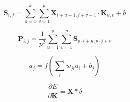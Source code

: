 
\begin{equation}
\mathbf{S}_{i,j} = \sum_{u=1}^{k} \sum_{v=1}^{k} \mathbf{X}_{i+u-1, j+v-1} \cdot \mathbf{K}_{u,v} + b
\end{equation}

\begin{equation}
\mathbf{P}_{i,j} = \frac{1}{p^2} \sum_{u=1}^{p} \sum_{v=1}^{p} \mathbf{S}_{p \cdot i + u, p \cdot j + v}
\end{equation}

\begin{equation}
a_j = f\left( \sum_{i} w_{ji} a_i + b_j \right)
\end{equation}

\begin{equation}
\frac{\partial E}{\partial \mathbf{K}} = \mathbf{X} \ast \delta
\end{equation}
